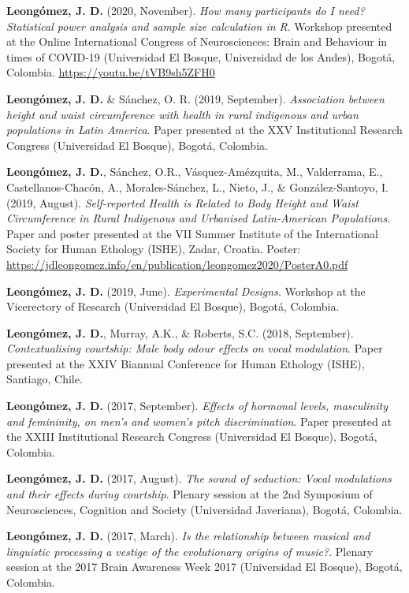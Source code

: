 \documentclass[11pt,a4paper,]{awesome-cv}
\begin{document}
\textbf{Leongómez, J. D.} (2020, November). \emph{How many participants
do I need? Statistical power analysis and sample size calculation in R}.
Workshop presented at the Online International Congress of
Neurosciences: Brain and Behaviour in times of COVID-19 (Universidad El
Bosque, Universidad de los Andes), Bogotá, Colombia.
\url{https://youtu.be/tVB9sh5ZFH0}

\textbf{Leongómez, J. D.} \& Sánchez, O. R. (2019, September).
\emph{Association between height and waist circumference with health in
rural indigenous and urban populations in Latin America}. Paper
presented at the XXV Institutional Research Congress (Universidad El
Bosque), Bogotá, Colombia.

\textbf{Leongómez, J. D.}, Sánchez, O.R., Vásquez-Amézquita, M.,
Valderrama, E., Castellanos-Chacón, A., Morales-Sánchez, L., Nieto, J.,
\& González-Santoyo, I. (2019, August). \emph{Self-reported Health is
Related to Body Height and Waist Circumference in Rural Indigenous and
Urbanised Latin-American Populations}. Paper and poster presented at the
VII Summer Institute of the International Society for Human Ethology
(ISHE), Zadar, Croatia. Poster:
\url{https://jdleongomez.info/en/publication/leongomez2020/PosterA0.pdf}

\textbf{Leongómez, J. D.} (2019, June). \emph{Experimental Designs}.
Workshop at the Vicerectory of Research (Universidad El Bosque), Bogotá,
Colombia.

\textbf{Leongómez, J. D.}, Murray, A.K., \& Roberts, S.C. (2018,
September). \emph{Contextualising courtship: Male body odour effects on
vocal modulation}. Paper presented at the XXIV Biannual Conference for
Human Ethology (ISHE), Santiago, Chile.

\textbf{Leongómez, J. D.} (2017, September). \emph{Effects of hormonal
levels, masculinity and femininity, on men's and women's pitch
discrimination}. Paper presented at the XXIII Institutional Research
Congress (Universidad El Bosque), Bogotá, Colombia.

\textbf{Leongómez, J. D.} (2017, August). \emph{The sound of seduction:
Vocal modulations and their effects during courtship}. Plenary session
at the 2nd Symposium of Neurosciences, Cognition and Society
(Universidad Javeriana), Bogotá, Colombia.

\textbf{Leongómez, J. D.} (2017, March). \emph{Is the relationship
between musical and linguistic processing a vestige of the evolutionary
origins of music?}. Plenary session at the 2017 Brain Awareness Week
2017 (Universidad El Bosque), Bogotá, Colombia.
\end{document}
